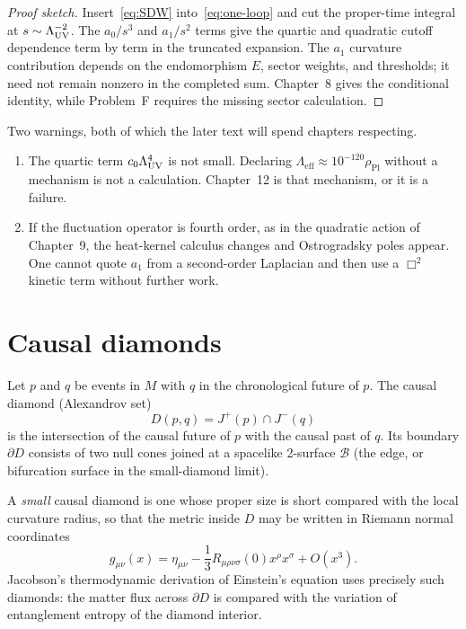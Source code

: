 \begin{proof}[Proof sketch]
  Insert~\eqref{eq:SDW} into~\eqref{eq:one-loop} and cut the
  proper-time integral at \(s\sim\Lambda_{\mathrm{UV}}^{-2}\). The \(a_0/s^3\) and
  \(a_1/s^2\) terms give the quartic and quadratic cutoff dependence
  term by term in the truncated expansion. The \(a_1\) curvature
  contribution depends on the endomorphism \(E\), sector weights, and
  thresholds; it need not remain nonzero in the completed sum.
  Chapter~8 gives the conditional identity, while Problem~F requires
  the missing sector calculation.
\end{proof}

Two warnings, both of which the later text will spend chapters
respecting.

\begin{enumerate}
  \item The quartic term \(c_0\Lambda_{\mathrm{UV}}^4\) is not small. Declaring
        \(\Lambda_{\mathrm{eff}}\approx 10^{-120}\rho_{\mathrm{Pl}}\)
        without a mechanism is not a calculation. Chapter~12 is that
        mechanism, or it is a failure.
  \item If the fluctuation operator is fourth order, as in the
        quadratic action of Chapter~9, the heat-kernel calculus
        changes and Ostrogradsky poles appear. One cannot quote
        \(a_1\) from a second-order Laplacian and then use a
        \(\Box^2\) kinetic term without further work.
\end{enumerate}

\section{Causal diamonds}
\label{sec:ch2-diamonds}

Let \(p\) and \(q\) be events in \(M\) with \(q\) in the chronological
future of \(p\). The causal diamond (Alexandrov set)
\begin{equation}
  \label{eq:diamond}
  D(p,q)
  =J^+(p)\cap J^-(q)
\end{equation}
is the intersection of the causal future of \(p\) with the causal past
of \(q\). Its boundary \(\partial D\) consists of two null cones
joined at a spacelike 2-surface \(\mathcal{B}\) (the edge, or
bifurcation surface in the small-diamond limit).

A \emph{small} causal diamond is one whose proper size is short
compared with the local curvature radius, so that the metric inside
\(D\) may be written in Riemann normal coordinates
\begin{equation}
  \label{eq:RNC}
  g_{\mu\nu}(x)
  =\eta_{\mu\nu}
   -\frac13 R_{\mu\rho\nu\sigma}(0)x^\rho x^\sigma
   +O(x^3).
\end{equation}
Jacobson's thermodynamic derivation of Einstein's equation uses
precisely such diamonds: the matter flux across \(\partial D\) is
compared with the variation of entanglement entropy of the diamond
interior.

